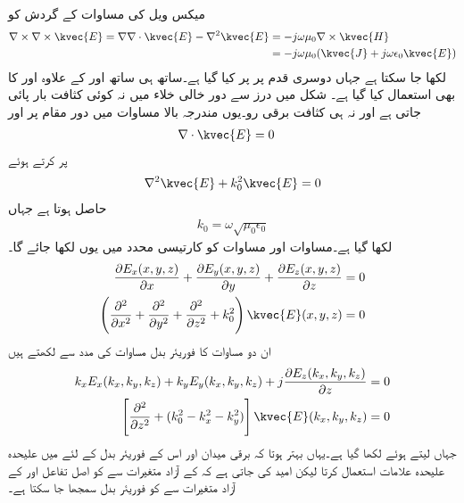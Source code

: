 میکس ویل کی مساوات  کے گردش کو
\begin{align*}
\nabla \times \nabla \times \kvec{E}=\nabla \nabla \cdot \kvec{E}-\nabla^2 \kvec{E}&=-j \omega \mu_0 \nabla \times \kvec{H} \\
&=-j \omega \mu_0 (\kvec{J}+j \omega \epsilon_0 \kvec{E})
\end{align*}
لکھا جا سکتا ہے جہاں دوسری قدم پر  پر کیا گیا ہے۔ساتھ ہی ساتھ  اور  کے علاوہ  اور 
 کا بھی استعمال کیا گیا ہے۔ شکل  میں درز سے دور خالی خلاء میں نہ کوئی کثافت بار پائی جاتی ہے اور نہ ہی کثافت برقی رو۔یوں مندرجہ بالا مساوات میں دور مقام پر  اور  
\begin{align}\label{مساوات_اینٹینا_فوریئر_الف}
\nabla \cdot \kvec{E}&=0
\end{align}
پر کرتے ہوئے
\begin{align}\label{مساوات_اینٹینا_فوریئر_ب}
\nabla^2 \kvec{E}+k_0^2 \kvec{E}=0
\end{align}
حاصل ہوتا ہے جہاں
\begin{align}
k_0= \omega \sqrt{ \mu_0 \epsilon_0}
\end{align}
لکھا گیا ہے۔مساوات  اور مساوات  کو کارتیسی محدد میں یوں لکھا جائے گا۔
\begin{align}
\frac{\partial E_x(x,y,z)}{\partial x}+\frac{\partial E_y(x,y,z)}{\partial y}+\frac{\partial E_z(x,y,z)}{\partial z}&=0 \label{مساوات_اینٹینا_فوریئر_پ}\\
\left(\frac{\partial^2}{\partial x^2}+\frac{\partial^2}{\partial y^2}+\frac{\partial^2}{\partial z^2} +k_0^2\right) \kvec{E}(x,y,z)&=0\label{مساوات_اینٹینا_فوریئر_ت}
\end{align}
ان دو مساوات کا فوریئر بدل مساوات  کی مدد سے لکھتے ہیں
\begin{align}
k_x E_x(k_x,k_y,k_z)+k_y E_y(k_x,k_y,k_z)+j \frac{\partial E_z(k_x,k_y,k_z)}{\partial z}&=0\label{مساوات_اینٹینا_فوریئر_ٹ}\\
\left[\frac{\partial^2}{\partial z^2}+(k_0^2-k_x^2-k_y^2)\right] \kvec{E}(k_x,k_y,k_z)&=0\label{مساوات_اینٹینا_فوریئر_ث}
\end{align}
 جہاں  لیتے ہوئے  لکھا گیا ہے۔یہاں بہتر ہوتا کہ برقی میدان اور اس کے فوریئر بدل کے لئے میں علیحدہ علیحدہ علامات استعمال کرتا لیکن امید کی جاتی ہے کہ  کے آزاد متغیرات  سے  کو اصل تفاعل اور  کے آزاد متغیرات  سے    کو فوریئر بدل سمجھا جا سکتا ہے۔

